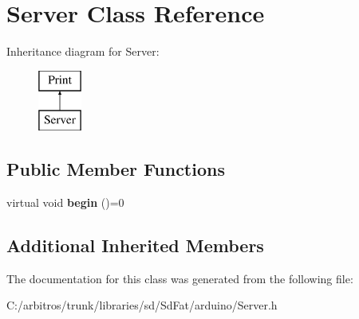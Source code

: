 \hypertarget{class_server}{\section{Server Class Reference}
\label{class_server}
}
Inheritance diagram for Server\-:\begin{figure}[H]
\begin{center}
\leavevmode
\includegraphics[height=2.000000cm]{class_server}
\end{center}
\end{figure}
\subsection*{Public Member Functions}
\begin{DoxyCompactItemize}
\item 
\hypertarget{class_server_aaf893c33f3c041e289a12c153dcc9789}{virtual void {\bfseries begin} ()=0}\label{class_server_aaf893c33f3c041e289a12c153dcc9789}

\end{DoxyCompactItemize}
\subsection*{Additional Inherited Members}


The documentation for this class was generated from the following file\-:\begin{DoxyCompactItemize}
\item 
C\-:/arbitros/trunk/libraries/sd/\-Sd\-Fat/arduino/Server.\-h\end{DoxyCompactItemize}
